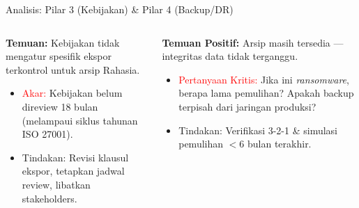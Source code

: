 \documentclass[aspectratio=169,11pt]{beamer}
\begin{document}
\begin{frame}{Analisis: Pilar 3 (Kebijakan) \& Pilar 4 (Backup/DR)}
    \vspace{0.2cm}
    \begin{columns}[T]
        \begin{premiumbox}
            \scriptsize
            \textbf{Temuan:} Kebijakan tidak mengatur spesifik ekspor terkontrol untuk arsip Rahasia.
            \vspace{0.1cm}
            \begin{itemize}
                \item \textcolor{red}{Akar:} Kebijakan belum direview 18 bulan (melampaui siklus tahunan ISO 27001).
                \item \textcolor{plnblue}{Tindakan:} Revisi klausul ekspor, tetapkan jadwal review, libatkan stakeholders.
            \end{itemize}
        \end{premiumbox}
        
        \begin{orangebox}
            \scriptsize
            \textbf{Temuan Positif:} Arsip masih tersedia --- integritas data tidak terganggu.
            \vspace{0.1cm}
            \begin{itemize}
                \item \textcolor{red}{Pertanyaan Kritis:} Jika ini \textit{ransomware}, berapa lama pemulihan? Apakah backup terpisah dari jaringan produksi?
                \item \textcolor{plnblue}{Tindakan:} Verifikasi 3-2-1 \& simulasi pemulihan $<$6 bulan terakhir.
            \end{itemize}
        \end{orangebox}
    \end{columns}
\end{frame}
\end{document}
